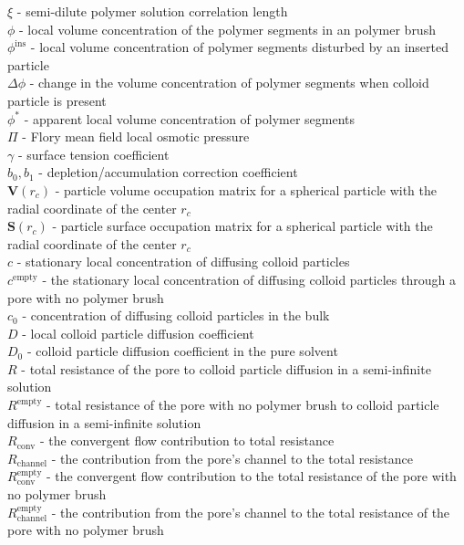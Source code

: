 \documentclass[12pt, a4paper]{article}
\begin{document}
$\xi$ - semi-dilute polymer solution correlation length \\
$\phi$ - local volume concentration of the polymer segments in an polymer brush\\
$\phi^{\textrm{ins}}$ - local volume concentration of polymer segments disturbed by an inserted particle\\
$\Delta \phi$ - change in the volume concentration of polymer segments when colloid particle is present \\
$\phi^{\ast}$ - apparent local volume concentration of polymer segments \\
$\Pi$ - Flory mean field local osmotic pressure \\
$\gamma$ - surface tension coefficient \\
$b_0, b_1$ - depletion/accumulation correction coefficient \\
$\textbf{V}(r_{c})$ - particle volume occupation matrix for a spherical particle with the radial coordinate of the center $r_{c}$ \\
$\textbf{S}(r_{c})$ - particle surface occupation matrix for a spherical particle with the radial coordinate of the center $r_{c}$ \\
$c$ - stationary local concentration of diffusing colloid particles \\
$c^{\textrm{empty}}$ - the stationary local concentration of diffusing colloid particles through a pore with no polymer brush \\
$c_0$ - concentration of diffusing colloid particles in the bulk \\
$D$ - local colloid particle diffusion coefficient \\
$D_0$ - colloid particle diffusion coefficient in the pure solvent \\
$R$ - total resistance of the pore to colloid particle diffusion in a semi-infinite solution \\
$R^{\textrm{empty}}$ - total resistance of the pore with no polymer brush to colloid particle diffusion in a semi-infinite solution \\
$R_{\textrm{conv}}$ - the convergent flow contribution to total resistance \\
$R_{\textrm{channel}}$ - the contribution from the pore's channel to the total resistance \\
$R^{\textrm{empty}}_{\textrm{conv}}$ - the convergent flow contribution to the total resistance of the pore with no polymer brush \\
$R^{\textrm{empty}}_{\textrm{channel}}$ - the contribution from the pore's channel to the total resistance of the pore with no polymer brush \\
\end{document}
